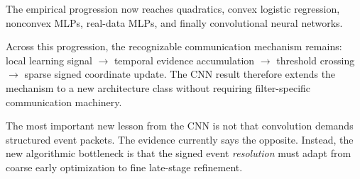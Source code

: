 The empirical progression now reaches quadratics, convex logistic regression, nonconvex MLPs, real-data MLPs, and finally convolutional neural networks.
\begin{takeawaybox}[title={Empirical progression through Experiment 15A}]
Across this progression, the recognizable communication mechanism remains: local learning signal $\rightarrow$ temporal evidence accumulation $\rightarrow$ threshold crossing $\rightarrow$ sparse signed coordinate update. The CNN result therefore extends the mechanism to a new architecture class without requiring filter-specific communication machinery.
\end{takeawaybox}
The most important new lesson from the CNN is not that convolution demands structured event packets. The evidence currently says the opposite. Instead, the new algorithmic bottleneck is that the signed event \emph{resolution} must adapt from coarse early optimization to fine late-stage refinement.